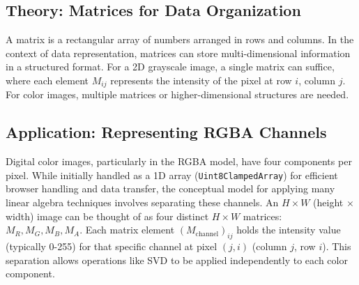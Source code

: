 \documentclass{article}
\begin{document}
\subsection{Theory: Matrices for Data Organization}
A matrix is a rectangular array of numbers arranged in rows and columns. In the context of data representation, matrices can store multi-dimensional information in a structured format. For a 2D grayscale image, a single matrix can suffice, where each element $M_{ij}$ represents the intensity of the pixel at row $i$, column $j$. For color images, multiple matrices or higher-dimensional structures are needed.

\subsection{Application: Representing RGBA Channels}
Digital color images, particularly in the RGBA model, have four components per pixel. While initially handled as a 1D array (\texttt{Uint8ClampedArray}) for efficient browser handling and data transfer, the conceptual model for applying many linear algebra techniques involves separating these channels. An $H \times W$ (height $\times$ width) image can be thought of as four distinct $H \times W$ matrices: $M_R, M_G, M_B, M_A$. Each matrix element $(M_{\text{channel}})_{ij}$ holds the intensity value (typically 0-255) for that specific channel at pixel $(j, i)$ (column $j$, row $i$). This separation allows operations like SVD to be applied independently to each color component.
\end{document}
